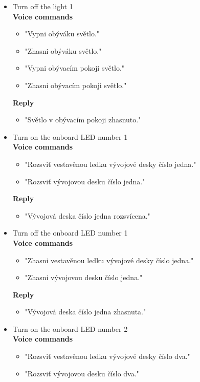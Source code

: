 \begin{itemize}
    \item Turn off the light 1\\
    \textbf{Voice commands}
    \begin{itemize}
        \item "Vypni obýváku světlo."
        \item "Zhasni obýváku světlo."
        \item "Vypni obývacím pokoji světlo."
        \item "Zhasni obývacím pokoji světlo."
    \end{itemize}
    \textbf{Reply}
    \begin{itemize}
        \item "Světlo v obývacím pokoji zhasnuto."
    \end{itemize} 
    \item Turn on the onboard LED number 1\\
    \textbf{Voice commands}
    \begin{itemize}
        \item "Rozsviť vestavěnou ledku vývojové desky číslo jedna."
        \item "Rozsviť vývojovou desku číslo jedna."
    \end{itemize}
    \textbf{Reply}
    \begin{itemize}
        \item "Vývojová deska číslo jedna rozsvícena."
    \end{itemize} 
    \item Turn off the onboard LED number 1\\
    \textbf{Voice commands}
    \begin{itemize}
        \item "Zhasni vestavěnou ledku vývojové desky číslo jedna."
        \item "Zhasni vývojovou desku číslo jedna."
    \end{itemize}
    \textbf{Reply}
    \begin{itemize}
        \item "Vývojová deska číslo jedna zhasnuta."
    \end{itemize}
    \item Turn on the onboard LED number 2\\
    \textbf{Voice commands}
    \begin{itemize}
        \item "Rozsviť vestavěnou ledku vývojové desky číslo dva."
        \item "Rozsviť vývojovou desku číslo dva."

\end{itemize}
\end{itemize}
